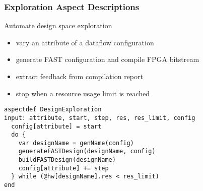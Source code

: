 \begin{frame}[fragile]
  \frametitle{Exploration Aspect Descriptions}
  Automate design space exploration
  \begin{itemize}
  \item vary an attribute of a dataflow configuration
  \item generate FAST configuration and compile FPGA bitstream
  \item extract feedback from compilation report
  \item stop when a resource usage limit is reached
  \end{itemize}
  \begin{lstlisting}[label=lst:label, style=lara]
aspectdef DesignExploration
input: attribute, start, step, res, res_limit, config
  config[attribute] = start
  do {
    var designName = genName(config)
    generateFASTDesign(designName, config)
    buildFASTDesign(designName)
    config[attribute] += step
  } while (@hw[designName].res < res_limit)
end
  \end{lstlisting}
\end{frame}
